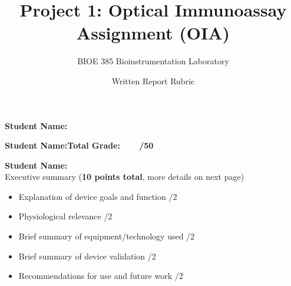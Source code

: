 \documentclass{article}
\title{Project 1: Optical Immunoassay Assignment (OIA)}
\author{BIOE 385 Bioinstrumentation Laboratory}
\date{Written Report Rubric}
\begin{document}
\large
\maketitle

\textbf{Student Name:}\vspace{0.5cm}

\textbf{Student Name:}\hfill 	\textbf{Total Grade:\ \ \ \ \underline{\hspace{1cm}}/50}\vspace{0.5cm}

\textbf{Student Name:}\hfill\\

Executive summary (\textbf{10 points total}, more details on next page)
\begin{small}
\begin{itemize}
	\item Explanation of device goals and function \hfill \underline{\hspace{1cm}}/2
	\item Physiological relevance \hfill \underline{\hspace{1cm}}/2
	\item Brief summary of equipment/technology used \hfill \underline{\hspace{1cm}}/2
	\item Brief summary of device validation \hfill \underline{\hspace{1cm}}/2
	\item Recommendations for use and future work \hfill \underline{\hspace{1cm}}/2
\end{itemize}
\end{small}\
\end{document}
